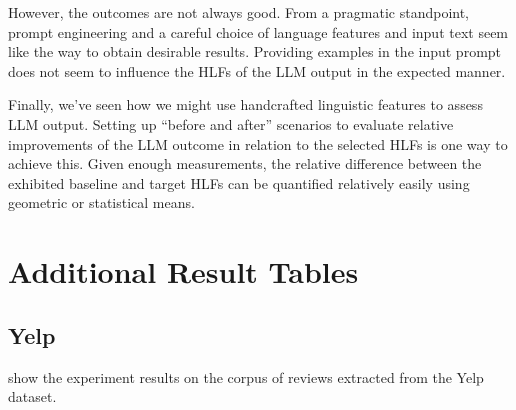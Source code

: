 \documentclass[11pt]{article}
\begin{document}
However, the outcomes are not always good.
From a pragmatic standpoint, prompt engineering and a careful choice of language
features and input text seem like the way to obtain desirable results.
Providing examples in the input prompt does not seem to influence the HLFs of
the LLM output in the expected manner.

Finally, we've seen how we might use handcrafted linguistic features to assess
LLM output.
Setting up ``before and after'' scenarios to evaluate relative improvements of
the LLM outcome in relation to the selected HLFs is one way to achieve this.
Given enough measurements, the relative difference between the exhibited
baseline and target HLFs can be quantified relatively easily using geometric or
statistical means.



\appendix

\section{Additional Result Tables}\label{sec:yelp-tables}
\subsection{Yelp}
 show the
experiment results on the corpus of reviews extracted from the Yelp dataset.
\end{document}
